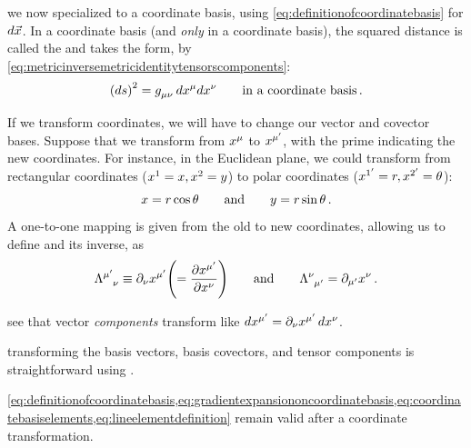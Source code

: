  we now specialized to a coordinate basis, using \cref{eq:definitionofcoordinatebasis} for $d\vec{x}$. In a coordinate basis (and \emph{only} in a coordinate basis), the squared distance is called the  and takes the form, by \cref{eq:metricinversemetricidentitytensorscomponents}:
%
\begin{equation}\label{eq:lineelementdefinition}
  \sqdifdist = \tmetric\mu\nu\,d\tvec\pos\mu d\tvec\pos\nu\qquad\text{in a coordinate basis}\,.
\end{equation}

 If we transform coordinates, we will have to change our vector and covector bases. Suppose that we transform from $\tvec\pos\mu$ to $\tvec\pos{\aidx\mu}$, with the prime indicating the new coordinates. For instance, in the Euclidean plane, we could transform from rectangular coordinates ($\tvec\pos 1 = \xpos, \tvec\pos 2 = \ypos$) to polar coordinates ($\tvec\pos{\aidx 1} = \cxpos,\tvec\pos{\aidx 2} = \cypos$):
%
\begin{equation*}
  x = r\cos\theta\qquad\text{and}\qquad
  y = r\sin\theta\,.
\end{equation*}
%
A one-to-one mapping is given from the old to new coordinates, allowing us to define  and its inverse,  as
%
\begin{equation*}
  \ttransmat{\aidx\mu}{\nu}\defas\ipd\nu\tvec\pos{\aidx\mu}
    \parens{= \dfrac{\partial\tvec\pos{\aidx\mu}}{\partial\tvec\pos\nu}}
  \qquad\text{and}\qquad
  \ttransmat{\nu}{\aidx\mu} = \ipd{\aidx\mu}\tvec\pos\nu\,.
\end{equation*}

 see that vector \emph{components} transform like $d\tvec\pos{\aidx\mu} = \ipd\nu\tvec\pos{\aidx\mu}\,d\tvec\pos\nu$.

 transforming the basis vectors, basis covectors, and tensor components is straightforward using .

 \cref{eq:definitionofcoordinatebasis,eq:gradientexpansiononcoordinatebasis,eq:coordinatebasiselements,eq:lineelementdefinition} remain valid after a coordinate transformation.

